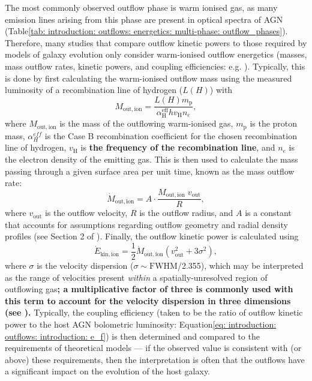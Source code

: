 The most commonly observed outflow phase is warm ionised gas, as many emission lines arising from this phase are present in optical spectra of AGN (Table\;\ref{tab: introduction: outflows: energetics: multi-phase: outflow_phases}). Therefore, many studies that compare outflow kinetic powers to those required by models of galaxy evolution only consider warm-ionised outflow energetics (masses, mass outflow rates, kinetic powers, and coupling efficiencies: e.g. \citealt{Liu2013, Rose2018, Tadhunter2019}). Typically, this is done by first calculating the warm-ionised outflow mass using the measured luminosity of a recombination line of hydrogen ($L(H)$) with
\begin{equation}
    M_\mathrm{out, ion} = \frac{L(H)m_\mathrm{p}}{\alpha^\mathrm{eff}_\mathrm{H}hv_\mathrm{H}n_e},
    \label{eq: introduction: outflows: energetics: mout}
\end{equation}
where $M_\mathrm{out, ion}$ is the mass of the outflowing warm-ionised gas, $m_\mathrm{p}$ is the proton mass, $\alpha^{eff}_{H}$ is the Case B recombination coefficient for the chosen recombination line of hydrogen, $v_\mathrm{H}$ is \textbf{the frequency of the recombination line}, and $n_e$ is the electron density of the emitting gas. This is then used to calculate the mass passing through a given surface area per unit time, known as the mass outflow rate:
\begin{equation}
    \dot{M}_\mathrm{out, ion} = A\cdot\frac{M_\mathrm{out, ion}\;v_\mathrm{out}}{R},
    \label{eq: introduction: outflows: energetics: mout_rate}
\end{equation}
where $v_\mathrm{out}$ is the outflow velocity, $R$ is the outflow radius, and $A$ is a constant that accounts for assumptions regarding outflow geometry and radial density profiles (see Section 2 of \citealt{Veilleux2020}). Finally, the outflow kinetic power is calculated using
\begin{equation}
    \dot{E}_\mathrm{kin, ion} = \frac{1}{2}{\dot{M}_\mathrm{out, ion}(v^2_\mathrm{out} + 3\sigma^2)},
    \label{eq: introduction: outflows: energetics: ekin}
\end{equation}
where $\sigma$ is the velocity dispersion ($\sigma\sim\mathrm{FWHM}$/2.355), which may be interpreted as the range of velocities present \textit{within} a spatially-unresolved region of outflowing gas\textbf{; a multiplicative factor of three is commonly used with this term to account for the velocity dispersion in three dimensions (see \citealt{Rupke2005b}).} Typically, the coupling efficiency (taken to be the ratio of outflow kinetic power to the host AGN bolometric luminosity: Equation\;\ref{eq: introduction: outflows: introduction: e_f}) is then determined and compared to the requirements of theoretical models --- if the observed value is consistent with (or above) these requirements, then the interpretation is often that the outflows have a significant impact on the evolution of the host galaxy.

